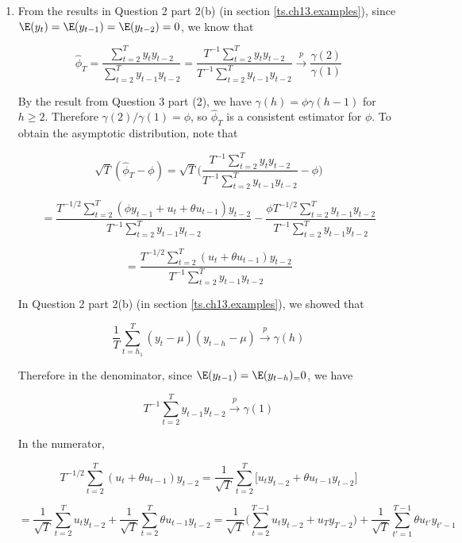 \begin{enumerate}[(1)]

\item From the results in Question 2 part 2(b) (in section \ref{ts.ch13.examples}), since \(\E(y_t) = \E(y_{t-1}) = \E(y_{t-2}) = 0\), we know that

\[
\hat{\phi}_T = \frac{\sum_{t=2}^T y_t y_{t-2}}{\sum_{t=2}^T y_{t-1} y_{t-2}} = \frac{T^{-1}\sum_{t=2}^T y_t y_{t-2}}{T^{-1}\sum_{t=2}^T y_{t-1} y_{t-2}} \xrightarrow{p} \frac{\gamma(2)}{\gamma(1)} 
\]

By the result from Question 3 part (2), we have \(\gamma(h) = \phi \gamma(h-1)\) for \(h \geq 2\). Therefore \(\gamma(2)/\gamma(1) = \phi\), so \(\hat{\phi}_T\) is a consistent estimator for \(\phi\). To obtain the asymptotic distribution, note that


\[
\sqrt{T}(\hat{\phi}_T - \phi) = \sqrt{T} \bigg(\frac{T^{-1}\sum_{t=2}^T y_t y_{t-2}}{T^{-1}\sum_{t=2}^T y_{t-1} y_{t-2}}  - \phi \bigg) 
\]

\[
= \frac{T^{-1/2}\sum_{t=2}^T (\phi y_{t-1} + u_t + \theta u_{t-1}) y_{t-2}}{T^{-1}\sum_{t=2}^T y_{t-1}y_{t-2}} -  \frac{\phi T^{-1/2}\sum_{t=2}^T y_{t-1} y_{t-2}}{T^{-1}\sum_{t=2}^T y_{t-1} y_{t-2}}
\]

\[
= \frac{T^{-1/2}\sum_{t=2}^T (u_t + \theta u_{t-1}) y_{t-2}}{T^{-1}\sum_{t=2}^T y_{t-1}y_{t-2}} 
\]

In Question 2 part 2(b) (in section \ref{ts.ch13.examples}), we showed that 

\[
\frac{1}{T}\sum_{t=h_1}^T (y_t - \mu)(y_{t-h} - \mu) \xrightarrow{p} \gamma(h)
\]

Therefore in the denominator, since \(\E(y_{t-1}) = \E(y_{t-h} )_= 0\), we have

\[
T^{-1}\sum_{t=2}^T y_{t-1}y_{t-2} \xrightarrow{p} \gamma(1)
\]

In the numerator, 

\[
T^{-1/2}\sum_{t=2}^T (u_t + \theta u_{t-1}) y_{t-2} = \frac{1}{\sqrt{T}}\sum_{t=2}^T \big[u_t y_{t-2} + \theta u_{t-1} y_{t-2} \big] 
\]

\[
= \frac{1}{\sqrt{T}}\sum_{t=2}^T u_t y_{t-2} +  \frac{1}{\sqrt{T}}\sum_{t=2}^T  \theta  u_{t-1} y_{t-2}  = \frac{1}{\sqrt{T}}\bigg(\sum_{t=2}^{T-1} u_t y_{t-2} + u_T y_{T-2} \bigg) +  \frac{1}{\sqrt{T}}\sum_{t'=1}^{T-1}  \theta  u_{t'} y_{t'-1} 
\]


\end{enumerate}

